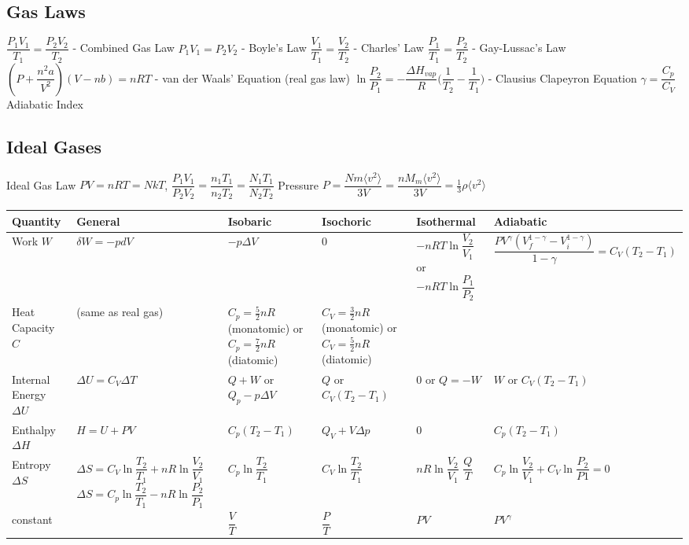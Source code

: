 \documentclass[8pt]{extarticle}
\begin{document}
\begin{small}
\section{Gas Laws}
$\dfrac{P_1V_1}{T_1}=\dfrac{P_2V_2}{T_2}$ - Combined Gas Law\hspace{0.1in}
$P_1V_1=P_2V_2$ - Boyle's Law \hspace{0.1in}
$\dfrac{V_1}{T_1}=\dfrac{V_2}{T_2}$ - Charles' Law\hspace{0.1in}
$\dfrac{P_1}{T_1}=\dfrac{P_2}{T_2}$ - Gay-Lussac's Law\\
$(P+\dfrac{n^2a}{V^2})(V-nb)=nRT$ - van der Waals' Equation (real gas law)\hspace{.1in}
$\ln\dfrac{P_2}{P_1}=-\dfrac{\Delta H_{vap}}{R}\bigg(\dfrac{1}{T_2}-\dfrac{1}{T_1}\bigg)$ - Clausius Clapeyron Equation \hspace{.1in}
$\gamma=\dfrac{C_p}{C_V}$ Adiabatic Index

\subsection{Ideal Gases}
Ideal Gas Law $PV=nRT=NkT$, $\dfrac{P_1V_1}{P_2V_2}=\dfrac{n_1T_1}{n_2T_2}=\dfrac{N_1T_1}{N_2T_2}$ \hspace{.1in}
Pressure $P=\dfrac{Nm\langle v^2\rangle}{3V}=\dfrac{nM_m\langle v^2\rangle}{3V}=\frac{1}{3}\rho\langle v^2\rangle$\\
\begin{tabular}{ | p{1.5cm} | p{4cm} | p{1.5cm} | p{2cm} | p{1.5cm} | p{4.7cm} | }
\hline
Quantity & General & Isobaric & Isochoric & Isothermal & Adiabatic \\
\hline
Work $W$ & $\delta W=-pdV$ & $-p\Delta V$ & $0$ & $-nRT\ln\dfrac{V_2}{V_1}$ or $-nRT\ln\dfrac{P_1}{P_2}$ & \vspace{.01in} $\dfrac{PV^\gamma(V^{1-\gamma}_f-V^{1-\gamma}_i)}{1-\gamma}=C_V(T_2-T_1)$ \\
\hline
Heat Capacity $C$ & (same as real gas) & \vspace{.001in} $C_p=\frac{5}{2}nR$ (monatomic) or $C_p=\frac{7}{2}nR$ (diatomic) & \vspace{.001in} $C_V=\frac{3}{2}nR$ (monatomic) or $C_V=\frac{5}{2}nR$ (diatomic)& & \\
\hline
Internal Energy $\Delta U$ & $\Delta U=C_V\Delta T$ & $Q+W$ or $Q_p-p\Delta V$ & $Q$ or \hspace{.1in} $C_V(T_2-T_1)$ & $0$ or $Q=-W$ & $W$ or $C_V(T_2-T_1)$ \\
\hline
Enthalpy $\Delta H$ & $H=U+PV$ & $C_p(T_2-T_1)$ & $Q_V + V\Delta p$ & $0$ & $C_p(T_2-T_1)$ \\
\hline
Entropy $\Delta S$ & $\Delta S=C_V\ln \dfrac{T_2}{T_1}+nR\ln\dfrac{V_2}{V_1}$ $\Delta S=C_p\ln\dfrac{T_2}{T_1}-nR\ln\dfrac{P_2}{P_1}$ & $C_p\ln\dfrac{T_2}{T_1}$ & $C_V\ln\dfrac{T_2}{T_1}$ & $nR\ln\dfrac{V_2}{V_1}$ $\dfrac{Q}{T}$ & $C_p\ln\dfrac{V_2}{V_1}+C_V\ln\dfrac{P_2}{P1}=0$ \\
\hline
constant & & $\dfrac{V}{T}$ & $\dfrac{P}{T}$ & $PV$ & $PV^\gamma$ \\
\hline
\end{tabular}


\end{small}
\end{document}
